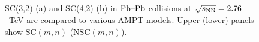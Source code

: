 \begin{figure}[!]
\begin{center}
        \caption{SC(3,2) (a) and SC(4,2) (b) in $\textnormal{Pb--Pb}$ collisions at $\sqrt{s_{\textnormal{NN}}}=2.76$~TeV are compared to various AMPT models. Upper (lower) panels show SC$(m,n)$ (NSC$(m,n)$).}
        \label{fig:Figure_4}
        \end{center}   
 \end{figure}
 
